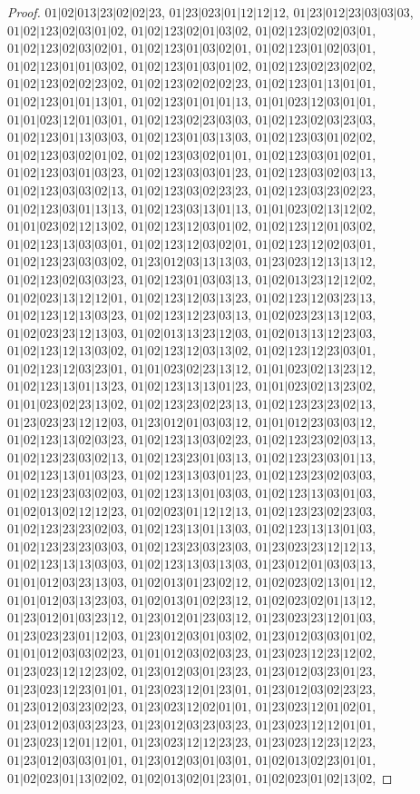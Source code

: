 \documentclass[12pt]{article}
\theoremstyle{plain}
\theoremstyle{definition}
\theoremstyle{remark}
\begin{document}
\begin{proof}
$01|02|013|23|02|02|23$, $01|23|023|01|12|12|12$, $01|23|012|23|03|03|03$, $01|02|123|02|03|01|02$, $01|02|123|02|01|03|02$, $01|02|123|02|02|03|01$, $01|02|123|02|03|02|01$, $01|02|123|01|03|02|01$, $01|02|123|01|02|03|01$, $01|02|123|01|01|03|02$, $01|02|123|01|03|01|02$, $01|02|123|02|23|02|02$, $01|02|123|02|02|23|02$, $01|02|123|02|02|02|23$, $01|02|123|01|13|01|01$, $01|02|123|01|01|13|01$, $01|02|123|01|01|01|13$, $01|01|023|12|03|01|01$, $01|01|023|12|01|03|01$, $01|02|123|02|23|03|03$, $01|02|123|02|03|23|03$, $01|02|123|01|13|03|03$, $01|02|123|01|03|13|03$, $01|02|123|03|01|02|02$, $01|02|123|03|02|01|02$, $01|02|123|03|02|01|01$, $01|02|123|03|01|02|01$, $01|02|123|03|01|03|23$, $01|02|123|03|03|01|23$, $01|02|123|03|02|03|13$, $01|02|123|03|03|02|13$, $01|02|123|03|02|23|23$, $01|02|123|03|23|02|23$, $01|02|123|03|01|13|13$, $01|02|123|03|13|01|13$, $01|01|023|02|13|12|02$, $01|01|023|02|12|13|02$, $01|02|123|12|03|01|02$, $01|02|123|12|01|03|02$, $01|02|123|13|03|03|01$, $01|02|123|12|03|02|01$, $01|02|123|12|02|03|01$, $01|02|123|23|03|03|02$, $01|23|012|03|13|13|03$, $01|23|023|12|13|13|12$, $01|02|123|02|03|03|23$, $01|02|123|01|03|03|13$, $01|02|013|23|12|12|02$, $01|02|023|13|12|12|01$, $01|02|123|12|03|13|23$, $01|02|123|12|03|23|13$, $01|02|123|12|13|03|23$, $01|02|123|12|23|03|13$, $01|02|023|23|13|12|03$, $01|02|023|23|12|13|03$, $01|02|013|13|23|12|03$, $01|02|013|13|12|23|03$, $01|02|123|12|13|03|02$, $01|02|123|12|03|13|02$, $01|02|123|12|23|03|01$, $01|02|123|12|03|23|01$, $01|01|023|02|23|13|12$, $01|01|023|02|13|23|12$, $01|02|123|13|01|13|23$, $01|02|123|13|13|01|23$, $01|01|023|02|13|23|02$, $01|01|023|02|23|13|02$, $01|02|123|23|02|23|13$, $01|02|123|23|23|02|13$, $01|23|023|23|12|12|03$, $01|23|012|01|03|03|12$, $01|01|012|23|03|03|12$, $01|02|123|13|02|03|23$, $01|02|123|13|03|02|23$, $01|02|123|23|02|03|13$, $01|02|123|23|03|02|13$, $01|02|123|23|01|03|13$, $01|02|123|23|03|01|13$, $01|02|123|13|01|03|23$, $01|02|123|13|03|01|23$, $01|02|123|23|02|03|03$, $01|02|123|23|03|02|03$, $01|02|123|13|01|03|03$, $01|02|123|13|03|01|03$, $01|02|013|02|12|12|23$, $01|02|023|01|12|12|13$, $01|02|123|23|02|23|03$, $01|02|123|23|23|02|03$, $01|02|123|13|01|13|03$, $01|02|123|13|13|01|03$, $01|02|123|23|23|03|03$, $01|02|123|23|03|23|03$, $01|23|023|23|12|12|13$, $01|02|123|13|13|03|03$, $01|02|123|13|03|13|03$, $01|23|012|01|03|03|13$, $01|01|012|03|23|13|03$, $01|02|013|01|23|02|12$, $01|02|023|02|13|01|12$, $01|01|012|03|13|23|03$, $01|02|013|01|02|23|12$, $01|02|023|02|01|13|12$, $01|23|012|01|03|23|12$, $01|23|012|01|23|03|12$, $01|23|023|23|12|01|03$, $01|23|023|23|01|12|03$, $01|23|012|03|01|03|02$, $01|23|012|03|03|01|02$, $01|01|012|03|03|02|23$, $01|01|012|03|02|03|23$, $01|23|023|12|23|12|02$, $01|23|023|12|12|23|02$, $01|23|012|03|01|23|23$, $01|23|012|03|23|01|23$, $01|23|023|12|23|01|01$, $01|23|023|12|01|23|01$, $01|23|012|03|02|23|23$, $01|23|012|03|23|02|23$, $01|23|023|12|02|01|01$, $01|23|023|12|01|02|01$, $01|23|012|03|03|23|23$, $01|23|012|03|23|03|23$, $01|23|023|12|12|01|01$, $01|23|023|12|01|12|01$, $01|23|023|12|12|23|23$, $01|23|023|12|23|12|23$, $01|23|012|03|03|01|01$, $01|23|012|03|01|03|01$, $01|02|013|02|23|01|01$, $01|02|023|01|13|02|02$, $01|02|013|02|01|23|01$, $01|02|023|01|02|13|02$, 
\end{proof}
\end{document}
